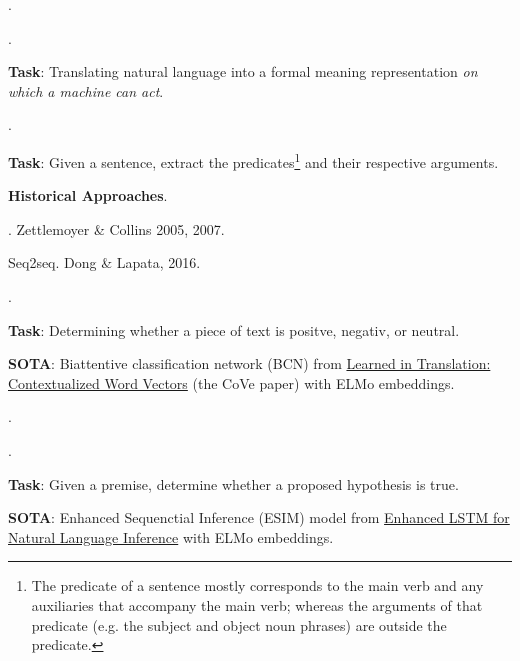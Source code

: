 \documentclass[11pt]{article}
\newcommand\myspace[1][]{\vspace{#1\bigskipamount}}
\newcommand\p{\Needspace{10\baselineskip} \noindent}
\begin{document}
\myspace
\p {}. 

\myspace
\p {}. 
\begin{compactitem}
	\item \textbf{Task}: Translating natural language into a formal meaning representation \textit{on which a machine can act}. 
\end{compactitem}

\myspace
\p {}. 
\begin{compactitem}
	\item \textbf{Task}: Given a sentence, extract the predicates\footnote{The predicate of a sentence mostly corresponds to the main verb and any auxiliaries that accompany the main verb; whereas the arguments of that predicate (e.g. the subject and object noun phrases) are outside the predicate.} and their respective arguments. 
	
	\item \textbf{Historical Approaches}.
	\begin{compactitem}
		\item {}. Zettlemoyer \& Collins 2005, 2007. 
		
		\item Seq2seq. Dong \& Lapata, 2016. 
	\end{compactitem}
\end{compactitem}

\myspace
\p {}. 
\begin{compactitem}
	\item \textbf{Task}: Determining whether a piece of text is positve, negativ, or neutral. 
	
	\item \textbf{SOTA}: Biattentive classification network (BCN) from \href{https://arxiv.org/abs/1708.00107}{Learned in Translation: Contextualized Word Vectors} (the CoVe paper) with ELMo embeddings.
\end{compactitem}

\myspace
\p {}. 

\myspace
\p {}. 
\begin{compactitem}
	\item \textbf{Task}: Given a premise, determine whether a proposed hypothesis is true. 
	
	\item \textbf{SOTA}: Enhanced Sequenctial Inference (ESIM) model from \href{https://arxiv.org/abs/1609.06038}{
		Enhanced LSTM for Natural Language Inference} with ELMo embeddings.
\end{compactitem}
\end{document}
